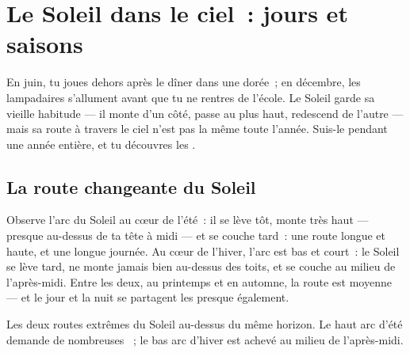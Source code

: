 \chapter{Le Soleil dans le ciel~: jours et saisons}\label{ch:g3:sun-days-seasons}

En juin, tu joues dehors après le dîner dans une  dorée~; en
décembre, les lampadaires s'allument avant que tu ne rentres de
l'école. Le Soleil garde sa vieille habitude --- il monte d'un côté,
passe au plus haut, redescend de l'autre --- mais sa route à travers
le ciel n'est pas la même toute l'année. Suis-le pendant une année
entière, et tu découvres les .

\section{La route changeante du Soleil}

\begin{example}\label{ex:g3:sun-days-seasons:roads}
Observe l'arc du Soleil au cœur de l'été~: il se lève tôt, monte très
haut --- presque au-dessus de ta tête à midi --- et se couche tard~:
une route longue et haute, et une longue journée. Au cœur de l'hiver,
l'arc est bas et court~: le Soleil se lève tard, ne monte jamais bien
au-dessus des toits, et se couche au milieu de l'après-midi. Entre
les deux, au printemps et en automne, la route est moyenne --- et le
jour et la nuit se partagent les  presque également.
\end{example}

\begin{omfigure}

{\small Les deux routes extrêmes du Soleil au-dessus du même horizon.
Le haut arc d'été demande de nombreuses ~; le bas arc d'hiver
est achevé au milieu de l'après-midi.}
\end{omfigure}


